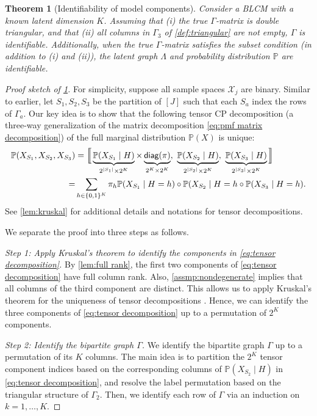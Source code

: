 \documentclass[10pt]{article} %
\newtheorem{theorem}{Theorem}
\newcommand{\PP}{\mathbb P}
\newcommand{\diag}{\textsf{\upshape diag}}
\begin{document}
\begin{theorem}[Identifiability of model components]\label{thm:identifiability}
    Consider a BLCM with a known latent dimension $K$.
    Assuming that (i) the true $\Gamma$-matrix is double triangular, and that (ii) all columns in $\Gamma_3$ of \cref{def:triangular} are not empty, $\Gamma$ is identifiable. Additionally, when the true $\Gamma$-matrix satisfies the subset condition (in addition to (i) and (ii)), the latent graph $\Lambda$ and probability distribution $\PP$ are identifiable.
\end{theorem}
%
%
\begin{proof}[Proof sketch of \cref{thm:identifiability}]
For simplicity, suppose all sample spaces $\mathcal{X}_j$ are binary. Similar to earlier, let $S_1, S_2, S_3$ be the partition of $[J]$ such that each $S_a$ index the rows of $\Gamma_a$.
Our key idea is to show that the following tensor CP decomposition (a three-way generalization of the matrix decomposition \eqref{eq:pmf matrix decomposition}) of the full marginal distribution $\PP(X)$ is unique:
\begin{align}\label{eq:tensor decomposition}
    \PP(X_{S_1}, X_{S_2}, X_{S_3}) &= \Big\llbracket \underbrace{\PP(X_{S_1} \mid H)}_{2^{|S_1|} \times 2^K} \times \underbrace{\diag(\pi)}_{2^K \times 2^K},~ \underbrace{\PP(X_{S_2} \mid H)}_{2^{|S_2|} \times 2^K}, ~\underbrace{\PP(X_{S_3} \mid H)}_{2^{|S_3|} \times 2^K}\Big\rrbracket  \\
    =&\sum_{h \in \{0,1\}^K} \pi_h \PP(X_{S_1} \mid H=h) \circ \PP(X_{S_2} \mid H=h \circ \PP(X_{S_3} \mid H=h). \notag
\end{align}
%
%
See \cref{lem:kruskal} for additional details and notations for tensor decompositions.
%

We separate the proof into three steps as follows.

\textit{Step 1: Apply Kruskal's theorem to identify the components in \eqref{eq:tensor decomposition}.}
By \cref{lem:full rank}, the first two components of \eqref{eq:tensor decomposition} have full column rank. Also, 
\cref{assmp:nondegenerate} implies that all columns of the third component are distinct. This allows us to apply Kruskal's theorem for the uniqueness of tensor decompositions \citep[][also see \cref{lem:kruskal}]{kruskal1977three}. Hence, we can identify the three components of \eqref{eq:tensor decomposition} up to a permutation of $2^K$ components.


\textit{Step 2: Identify the bipartite graph $\Gamma$.}
We identify the bipartite graph $\Gamma$ up to a permutation of its $K$ columns. The main idea is to partition the $2^K$ tensor component indices based on the corresponding columns of $\PP(X_{S_2} \mid H)$ in \eqref{eq:tensor decomposition}, and resolve the label permutation based on the triangular structure of $\Gamma_2$. Then, we identify each row of $\Gamma$ via an induction on $k=1,\ldots,K$.
%



\end{proof}
\end{document}
